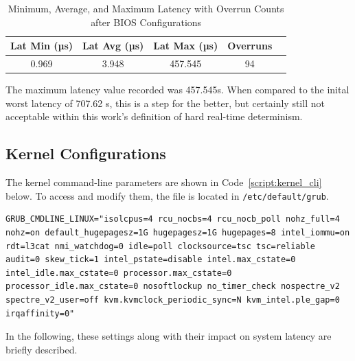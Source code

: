 \documentclass[MMR,Master,english]{twbook}
\begin{document}
\begin{table}[H]
	\centering
	\caption[Latency Statistics with Overrun Counts after BIOS Configurations]{Minimum, Average, and Maximum Latency with Overrun Counts after BIOS Configurations}
	\label{tab:latency_overrun_msw_new_virt_bios}
	\begin{tabular}{|c|c|c|c|c|}
		\hline
		\textbf{Lat Min (µs)} & \textbf{Lat Avg (µs)} & \textbf{Lat Max (µs)} & \textbf{Overruns} \\ \hline
		0.969                 & 3.948                 & 457.545               & 94                \\ \hline
	\end{tabular}
\end{table}

\noindent The maximum latency value recorded was 457.545\textmu s. When compared to the inital worst latency of 707.62 \textmu s, this is a step for the better, but certainly still not acceptable within this work's definition of hard real-time determinism.

\subsection{Kernel Configurations}\label{subsec:kernel_configurations}
The kernel command-line parameters are shown in Code~\ref{script:kernel_cli} below. To access and modify them, the file is located in \texttt{/etc/default/grub}.

\vspace{2em}
\begin{lstlisting}[name={Kernel Configurations for Real-Time Performance},label={script:kernel_cli}]
		GRUB_CMDLINE_LINUX="isolcpus=4 rcu_nocbs=4 rcu_nocb_poll nohz_full=4 nohz=on default_hugepagesz=1G hugepagesz=1G hugepages=8 intel_iommu=on rdt=l3cat nmi_watchdog=0 idle=poll clocksource=tsc tsc=reliable audit=0 skew_tick=1 intel_pstate=disable intel.max_cstate=0 intel_idle.max_cstate=0 processor.max_cstate=0 processor_idle.max_cstate=0 nosoftlockup no_timer_check nospectre_v2 spectre_v2_user=off kvm.kvmclock_periodic_sync=N kvm_intel.ple_gap=0 irqaffinity=0"
\end{lstlisting}

\noindent In the following, these settings along with their impact on system latency are briefly described.
\end{document}
